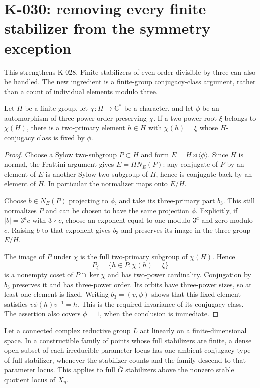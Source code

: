 \section{K-030: removing every finite stabilizer from the symmetry exception}

This strengthens K-028.  Finite stabilizers of even order divisible by
three can also be handled.  The new ingredient is a finite-group
conjugacy-class argument, rather than a count of individual elements
modulo three.

\begin{lemma}[K-030a]
Let $H$ be a finite group, let $\chi:H\to\mathbb C^*$ be a
character, and let $\phi$ be an automorphism of three-power order
preserving $\chi$.  If a two-power root $\xi$ belongs to $\chi(H)$,
there is a two-primary element $h\in H$ with $\chi(h)=\xi$ whose
$H$-conjugacy class is fixed by $\phi$.
\end{lemma}

\begin{proof}
Choose a Sylow two-subgroup $P\subset H$ and form
$E=H\rtimes\langle\phi\rangle$.  Since $H$ is normal, the
Frattini argument gives $E=H N_E(P)$: any conjugate of $P$ by
an element of $E$ is another Sylow two-subgroup of $H$, hence
is conjugate back by an element of $H$.  In particular the
normalizer maps onto $E/H$.

Choose $b\in N_E(P)$ projecting to $\phi$, and take its
three-primary part $b_3$.  This still normalizes $P$ and can be
chosen to have the same projection $\phi$.  Explicitly, if
$|b|=3^a c$ with $3\nmid c$, choose an exponent equal to one
modulo $3^a$ and zero modulo $c$.  Raising $b$ to that exponent
gives $b_3$ and preserves its image in the three-group $E/H$.

The image of $P$ under $\chi$ is the full two-primary subgroup
of $\chi(H)$.  Hence
\[
                  P_\xi=\{h\in P:\chi(h)=\xi\}
\]
is a nonempty coset of $P\cap\ker\chi$ and has two-power
cardinality.  Conjugation by $b_3$ preserves it and has
three-power order.  Its orbits have three-power sizes, so at
least one element is fixed.  Writing $b_3=(v,\phi)$ shows that
this fixed element satisfies $v\phi(h)v^{-1}=h$.  This is the
required invariance of its conjugacy class.  The assertion also
covers $\phi=1$, when the conclusion is immediate.
\end{proof}

\begin{lemma}
Let a connected complex reductive group $L$ act linearly on a
finite-dimensional space.  In a constructible family of points
whose full stabilizers are finite, a dense open subset of each
irreducible parameter locus has one ambient conjugacy type of
full stabilizer, whenever the stabilizer counts and the family
descend to that parameter locus.  This applies to full
$\overline G$ stabilizers above the nonzero stable quotient locus
of $X_n$.
\end{lemma}

